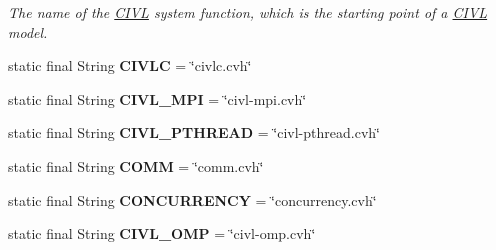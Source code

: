 \begin{DoxyCompactItemize}
\begin{DoxyCompactList}\small\item\em The name of the \hyperlink{classedu_1_1udel_1_1cis_1_1vsl_1_1civl_1_1CIVL}{C\+I\+V\+L} system function, which is the starting point of a \hyperlink{classedu_1_1udel_1_1cis_1_1vsl_1_1civl_1_1CIVL}{C\+I\+V\+L} model. \end{DoxyCompactList}\item 
\hypertarget{classedu_1_1udel_1_1cis_1_1vsl_1_1civl_1_1config_1_1IF_1_1CIVLConstants_a60a7d4f328fb2fb6895f4bcc585b30bd}{}static final String {\bfseries C\+I\+V\+L\+C} = \char`\"{}civlc.\+cvh\char`\"{}\label{classedu_1_1udel_1_1cis_1_1vsl_1_1civl_1_1config_1_1IF_1_1CIVLConstants_a60a7d4f328fb2fb6895f4bcc585b30bd}

\item 
\hypertarget{classedu_1_1udel_1_1cis_1_1vsl_1_1civl_1_1config_1_1IF_1_1CIVLConstants_a02bcf71e9a906989c6ef7ecc38ff0f63}{}static final String {\bfseries C\+I\+V\+L\+\_\+\+M\+P\+I} = \char`\"{}civl-\/mpi.\+cvh\char`\"{}\label{classedu_1_1udel_1_1cis_1_1vsl_1_1civl_1_1config_1_1IF_1_1CIVLConstants_a02bcf71e9a906989c6ef7ecc38ff0f63}

\item 
\hypertarget{classedu_1_1udel_1_1cis_1_1vsl_1_1civl_1_1config_1_1IF_1_1CIVLConstants_a11ae7cb3c919f781751452dfb57bd50d}{}static final String {\bfseries C\+I\+V\+L\+\_\+\+P\+T\+H\+R\+E\+A\+D} = \char`\"{}civl-\/pthread.\+cvh\char`\"{}\label{classedu_1_1udel_1_1cis_1_1vsl_1_1civl_1_1config_1_1IF_1_1CIVLConstants_a11ae7cb3c919f781751452dfb57bd50d}

\item 
\hypertarget{classedu_1_1udel_1_1cis_1_1vsl_1_1civl_1_1config_1_1IF_1_1CIVLConstants_a4d420344c116e0e66e1a833615627219}{}static final String {\bfseries C\+O\+M\+M} = \char`\"{}comm.\+cvh\char`\"{}\label{classedu_1_1udel_1_1cis_1_1vsl_1_1civl_1_1config_1_1IF_1_1CIVLConstants_a4d420344c116e0e66e1a833615627219}

\item 
\hypertarget{classedu_1_1udel_1_1cis_1_1vsl_1_1civl_1_1config_1_1IF_1_1CIVLConstants_a8a3566652aaf3d437b7b06aed2d1c093}{}static final String {\bfseries C\+O\+N\+C\+U\+R\+R\+E\+N\+C\+Y} = \char`\"{}concurrency.\+cvh\char`\"{}\label{classedu_1_1udel_1_1cis_1_1vsl_1_1civl_1_1config_1_1IF_1_1CIVLConstants_a8a3566652aaf3d437b7b06aed2d1c093}

\item 
\hypertarget{classedu_1_1udel_1_1cis_1_1vsl_1_1civl_1_1config_1_1IF_1_1CIVLConstants_a040d1a670ca16eac5681b8a177af1166}{}static final String {\bfseries C\+I\+V\+L\+\_\+\+O\+M\+P} = \char`\"{}civl-\/omp.\+cvh\char`\"{}\label{classedu_1_1udel_1_1cis_1_1vsl_1_1civl_1_1config_1_1IF_1_1CIVLConstants_a040d1a670ca16eac5681b8a177af1166}


\end{DoxyCompactItemize}
